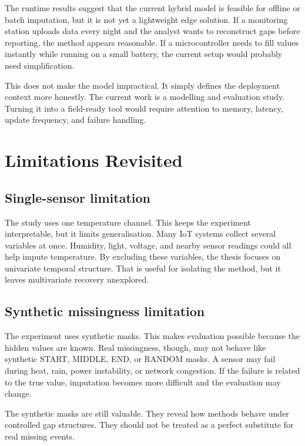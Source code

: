 The runtime results suggest that the current hybrid model is feasible for offline or batch imputation, but it is not yet a lightweight edge solution. If a monitoring station uploads data every night and the analyst wants to reconstruct gaps before reporting, the method appears reasonable. If a microcontroller needs to fill values instantly while running on a small battery, the current setup would probably need simplification.

This does not make the model impractical. It simply defines the deployment context more honestly. The current work is a modelling and evaluation study. Turning it into a field-ready tool would require attention to memory, latency, update frequency, and failure handling.

\section{Limitations Revisited}

\subsection{Single-sensor limitation}

The study uses one temperature channel. This keeps the experiment interpretable, but it limits generalisation. Many IoT systems collect several variables at once. Humidity, light, voltage, and nearby sensor readings could all help impute temperature. By excluding these variables, the thesis focuses on univariate temporal structure. That is useful for isolating the method, but it leaves multivariate recovery unexplored.

\subsection{Synthetic missingness limitation}

The experiment uses synthetic masks. This makes evaluation possible because the hidden values are known. Real missingness, though, may not behave like synthetic START, MIDDLE, END, or RANDOM masks. A sensor may fail during heat, rain, power instability, or network congestion. If the failure is related to the true value, imputation becomes more difficult and the evaluation may change.

The synthetic masks are still valuable. They reveal how methods behave under controlled gap structures. They should not be treated as a perfect substitute for real missing events.

